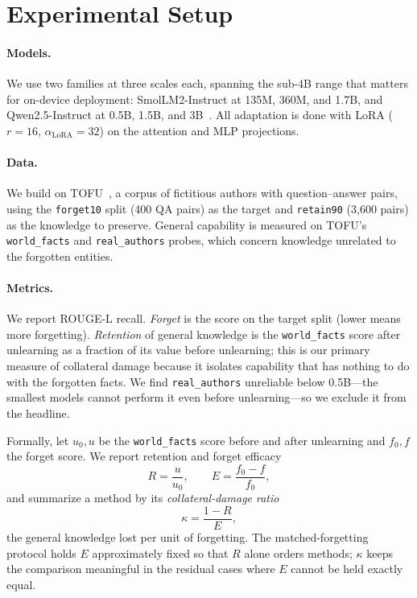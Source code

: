 \documentclass[sigconf,nonacm]{acmart}
\begin{document}
\section{Experimental Setup}
\label{sec:setup}
\paragraph{Models.} We use two families at three scales each, spanning the sub-4B range that matters for on-device deployment: SmolLM2-Instruct at 135M, 360M, and 1.7B, and Qwen2.5-Instruct at 0.5B, 1.5B, and 3B~\cite{smollm2,qwen25}. All adaptation is done with LoRA ($r{=}16$, $\alpha_{\text{LoRA}}{=}32$) on the attention and MLP projections.

\paragraph{Data.} We build on TOFU~\cite{tofu}, a corpus of fictitious authors with question--answer pairs, using the \texttt{forget10} split (400 QA pairs) as the target and \texttt{retain90} (3{,}600 pairs) as the knowledge to preserve. General capability is measured on TOFU's \texttt{world\_facts} and \texttt{real\_authors} probes, which concern knowledge unrelated to the forgotten entities.

\paragraph{Metrics.} We report ROUGE-L recall. \emph{Forget} is the score on the target split (lower means more forgetting). \emph{Retention} of general knowledge is the \texttt{world\_facts} score after unlearning as a fraction of its value before unlearning; this is our primary measure of collateral damage because it isolates capability that has nothing to do with the forgotten facts. We find \texttt{real\_authors} unreliable below 0.5B---the smallest models cannot perform it even before unlearning---so we exclude it from the headline.

Formally, let $u_0,u$ be the \texttt{world\_facts} score before and after unlearning and $f_0,f$ the forget score. We report retention and forget efficacy
\begin{equation}
R = \frac{u}{u_0}, \qquad E = \frac{f_0 - f}{f_0},
\end{equation}
and summarize a method by its \emph{collateral-damage ratio}
\begin{equation}
\kappa = \frac{1-R}{E},
\label{eq:kappa}
\end{equation}
the general knowledge lost per unit of forgetting. The matched-forgetting protocol holds $E$ approximately fixed so that $R$ alone orders methods; $\kappa$ keeps the comparison meaningful in the residual cases where $E$ cannot be held exactly equal.
\end{document}
